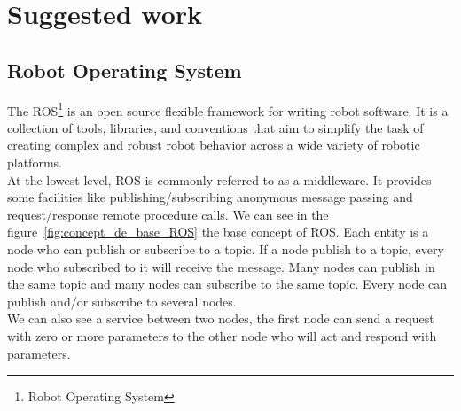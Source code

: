 \chapter{Suggested work}
\setlength{\parskip}{2.5ex plus .4ex minus .4ex}
\section{Robot Operating System}\label{sec:ROS}
The ROS\footnote{Robot Operating System} is an open source flexible framework for writing robot software. It is a collection of tools, libraries, and conventions that aim to simplify the task of creating complex and robust robot behavior across a wide variety of robotic platforms.\\
At the lowest level, ROS is commonly referred to as a middleware. It provides some facilities like publishing/subscribing anonymous message passing and request/response remote procedure calls. We can see in the figure~\ref{fig:concept_de_base_ROS} the base concept of ROS. Each entity is a node who can publish or subscribe to a topic. If a node publish to a topic, every node who subscribed to it will receive the message. Many nodes can publish in the same topic and many nodes can subscribe to the same topic. Every node can publish and/or subscribe to several nodes.\\
We can also see a service between two nodes, the first node can send a request with zero or more parameters to the other node who will act and respond with parameters.

